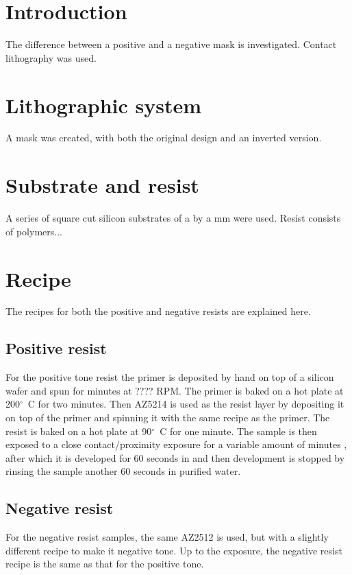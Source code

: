 \section*{Introduction}
The difference between a positive and a negative mask is investigated. Contact lithography was used.

\section*{Lithographic system}
A mask was created, with both the original design and an inverted version.

\section*{Substrate and resist}
A series of square cut silicon substrates of a by a mm  were used. Resist consists of polymers...


\section*{Recipe}
The recipes for both the positive and negative resists are explained here.
\subsection*{Positive resist}
For the positive tone resist the primer  is deposited by hand on top of a silicon wafer and spun for  minutes at ???? RPM. The primer is baked on a hot plate at 200$^{\circ}$~C for two minutes. Then AZ5214  is used as the resist layer by depositing it on top of the primer and spinning it with the same recipe as the primer. The resist is baked on a hot plate at 90$^{\circ}$~C for one minute. The sample is then exposed to a close contact/proximity  exposure for a variable amount of minutes , after which it is developed for 60 seconds in  and then development is stopped by rinsing the sample another 60 seconds in purified water.

\subsection*{Negative resist}
For the negative resist samples, the same AZ2512 is used, but with a slightly different recipe to make it negative tone. Up to the exposure, the negative resist recipe is the same as that for the positive tone. 

